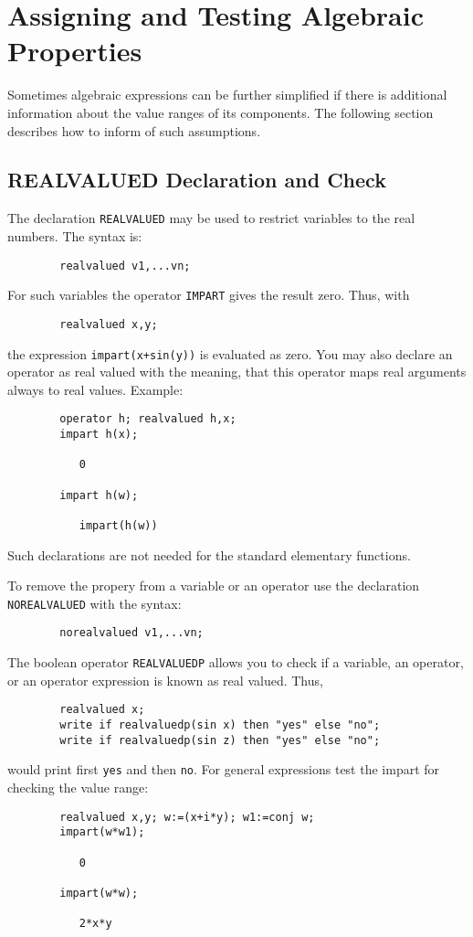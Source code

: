 \chapter{Assigning and Testing Algebraic Properties}

Sometimes algebraic expressions can be further simplified if
there is additional information about the value ranges
of its components. The following section describes 
how to inform {\REDUCE} of such assumptions.


\section{REALVALUED Declaration and Check}


The declaration {\tt REALVALUED}  may be used 
to restrict variables to the real numbers. The syntax is:
\begin{verbatim}
        realvalued v1,...vn;
\end{verbatim}
For such variables the operator {\tt IMPART}  gives 
the result zero. Thus, with
\begin{verbatim}
        realvalued x,y;
\end{verbatim}
the expression \verb;impart(x+sin(y)); is evaluated as zero.
You may also declare an operator as real valued
with the meaning, that this operator maps real arguments always to
real values. Example:
\begin{verbatim}
        operator h; realvalued h,x;
        impart h(x);
   
           0
  
        impart h(w);

           impart(h(w))
\end{verbatim}
Such declarations are not needed for the standard elementary functions.
        
To remove the propery from a variable or an operator use the declaration
{\tt NOREALVALUED}  with the syntax:
\begin{verbatim}
        norealvalued v1,...vn;
\end{verbatim}

The boolean operator {\tt REALVALUEDP} 
allows you to check if a variable, an operator, or
an operator expression is known as real valued.
Thus, 
\begin{verbatim}
        realvalued x;
        write if realvaluedp(sin x) then "yes" else "no";
        write if realvaluedp(sin z) then "yes" else "no";
\end{verbatim}
would print first \verb+yes+ and then \verb+no+. For general
expressions test the impart for checking the value range:
\begin{verbatim}
        realvalued x,y; w:=(x+i*y); w1:=conj w;
        impart(w*w1);

           0

        impart(w*w);

           2*x*y
\end{verbatim}


